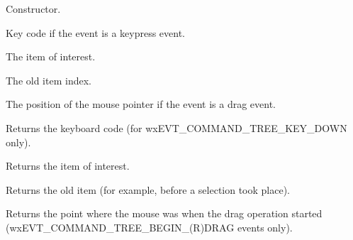 Constructor.



Key code if the event is a keypress event.



The item of interest.



The old item index.



The position of the mouse pointer if the event is a drag event.

\label{wxtreeeventgetcode}


Returns the keyboard code (for wxEVT\_COMMAND\_TREE\_KEY\_DOWN only).

\label{wxtreeeventgetitem}


Returns the item of interest.

\label{wxtreeeventgetolditem}


Returns the old item (for example, before a selection took place).

\label{wxtreeeventgetpoint}


Returns the point where the mouse was when the drag operation started
(wxEVT\_COMMAND\_TREE\_BEGIN\_(R)DRAG events only).

